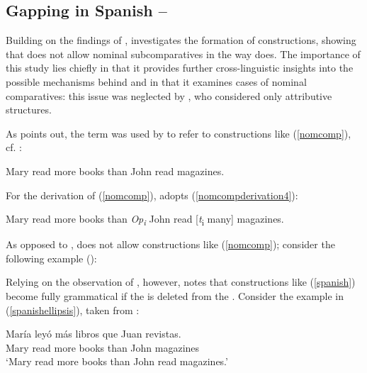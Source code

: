 \subsection{Gapping in Spanish -- \citet{reglero2006}} \label{sec:4gapping}
Building on the findings of \citet{kennedymerchant2000}, \citet{reglero2006} investigates the formation of   constructions, showing that  does not allow nominal subcomparatives in the way  does. The importance of this study lies chiefly in that it provides further cross-linguistic insights into the possible mechanisms behind  and in that it examines cases of nominal comparatives: this issue was neglected by \citet{kennedymerchant2000}, who considered only attributive structures.

As \citet[67]{reglero2006} points out, the term  was used by \citet{bresnan1972diss} to refer to constructions like (\ref{nomcomp}), cf. \citet[67, ex. 1]{reglero2006}:

\ea Mary read more books than John read magazines. \label{nomcomp}
\z

For the derivation of (\ref{nomcomp}), \citet[68, ex. 4]{reglero2006} adopts (\ref{nomcompderivation4}):

\ea Mary read more books than \textit{Op\textsubscript{i}} John read [\emph{t}\textsubscript{i} many] magazines. \label{nomcompderivation4}
\z

As opposed to ,  does not allow constructions like (\ref{nomcomp}); consider the following example (\citealt[68, ex. 7]{reglero2006}):

\z

Relying on the observation of \citet{price1990}, however, \citet[68]{reglero2006} notes that constructions like (\ref{spanish}) become fully grammatical if the  is deleted from the . Consider the example in (\ref{spanishellipsis}), taken from \citet[68, ex. 8]{reglero2006}:

\ea \gll Mar\'ia ley\'o m\'as libros que Juan revistas. \label{spanishellipsis}\\
Mary read more books than John magazines\\
\glt `Mary read more books than John read magazines.'
\z

